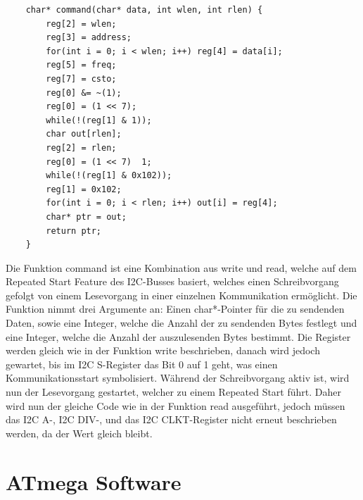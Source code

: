 \documentclass[12pt]{article}
\begin{document}
\begin{verbatim}
    char* command(char* data, int wlen, int rlen) {
        reg[2] = wlen;
        reg[3] = address;
        for(int i = 0; i < wlen; i++) reg[4] = data[i];
        reg[5] = freq;
        reg[7] = csto;
        reg[0] &= ~(1);
        reg[0] = (1 << 7);
        while(!(reg[1] & 1));
        char out[rlen];
        reg[2] = rlen;
        reg[0] = (1 << 7)  1;
        while(!(reg[1] & 0x102));
        reg[1] = 0x102;
        for(int i = 0; i < rlen; i++) out[i] = reg[4];
        char* ptr = out;
        return ptr;
    }
\end{verbatim}
Die Funktion command ist eine Kombination aus write und read, welche auf dem Repeated Start Feature des I2C-Busses basiert, welches einen Schreibvorgang gefolgt von einem Lesevorgang in einer einzelnen Kommunikation ermöglicht. Die Funktion nimmt drei Argumente an: Einen char*-Pointer für die zu sendenden Daten, sowie eine Integer, welche die Anzahl der zu sendenden Bytes festlegt und eine Integer, welche die Anzahl der auszulesenden Bytes bestimmt. Die Register werden gleich wie in der Funktion write beschrieben, danach wird jedoch gewartet, bis im I2C S-Register das Bit 0 auf 1 geht, was einen Kommunikationsstart symbolisiert. Während der Schreibvorgang aktiv ist, wird nun der Lesevorgang gestartet, welcher zu einem Repeated Start führt. Daher wird nun der gleiche Code wie in der Funktion read ausgeführt, jedoch müssen das I2C A-, I2C DIV-, und das I2C CLKT-Register nicht erneut beschrieben werden, da der Wert gleich bleibt. 
\newpage\section{ATmega Software}
\end{document}
